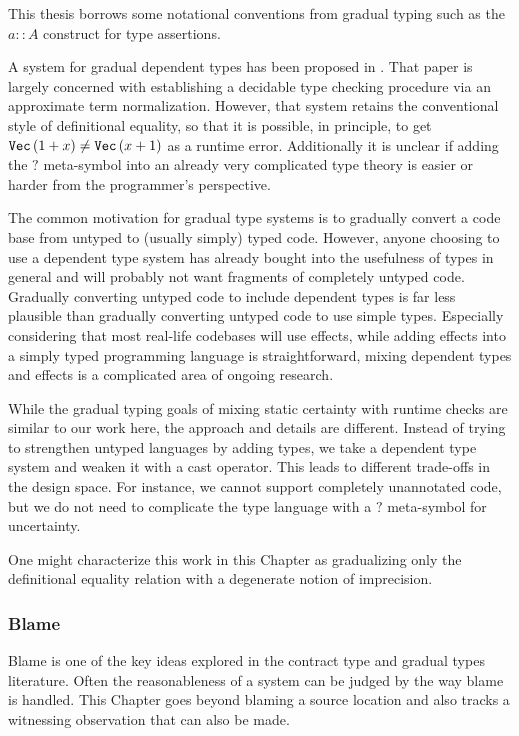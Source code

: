 This thesis borrows some notational conventions from gradual typing such as the $a::A$ construct for type assertions.
 
A system for gradual dependent types has been proposed in \cite{10.1145/3341692}.
That paper is largely concerned with establishing a decidable type checking procedure via an approximate term normalization.
However, that system retains the conventional style of definitional equality, so that it is possible, in principle, to get $\mathtt{Vec}{}\,(1+x)\neq \mathtt{Vec}{}\,(x+1)$ as a runtime error.
Additionally it is unclear if adding the $?$ meta-symbol into an already very complicated type theory is easier or harder from the programmer's perspective.
 
The common motivation for gradual type systems is to gradually convert a code base from untyped to (usually simply) typed code.
However, anyone choosing to use a dependent type system has already bought into the usefulness of types in general and will probably not want fragments of completely untyped code.
Gradually converting untyped code to include dependent types is far less plausible than gradually converting untyped code to use simple types.
Especially considering that most real-life codebases will use effects, while adding effects into a simply typed programming language is straightforward, mixing dependent types and effects is a complicated area of ongoing research.

While the gradual typing goals of mixing static certainty with runtime checks are similar to our work here, the approach and details are different.
Instead of trying to strengthen untyped languages by adding types, we take a dependent type system and weaken it with a cast operator.
This leads to different trade-offs in the design space.
For instance, we cannot support completely unannotated code, but we do not need to complicate the type language with a $?$ meta-symbol for uncertainty.

One might characterize this work in this Chapter as gradualizing only the definitional equality relation with a degenerate notion of imprecision.
 
\subsubsection{Blame}
 
Blame is one of the key ideas explored in the contract type and gradual types literature\cite{10.1007/978-3-642-00590-9_1,wadler:LIPIcs:2015:5033,10.1145/3110283}.
Often the reasonableness of a system can be judged by the way blame is handled\cite{wadler:LIPIcs:2015:5033}.
This Chapter goes beyond blaming a source location and also tracks a witnessing observation that can also be made.
 
